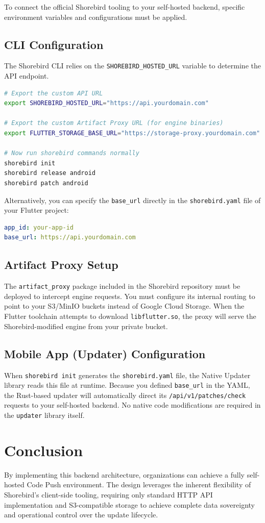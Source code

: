 \documentclass[12pt,a4paper]{article}
\begin{document}
To connect the official Shorebird tooling to your self-hosted backend, specific environment variables and configurations must be applied.

\subsection{CLI Configuration}
The Shorebird CLI relies on the \texttt{SHOREBIRD\_HOSTED\_URL} variable to determine the API endpoint.

\begin{lstlisting}[language=bash]
# Export the custom API URL
export SHOREBIRD_HOSTED_URL="https://api.yourdomain.com"

# Export the custom Artifact Proxy URL (for engine binaries)
export FLUTTER_STORAGE_BASE_URL="https://storage-proxy.yourdomain.com"

# Now run shorebird commands normally
shorebird init
shorebird release android
shorebird patch android
\end{lstlisting}

Alternatively, you can specify the \texttt{base\_url} directly in the \texttt{shorebird.yaml} file of your Flutter project:
\begin{lstlisting}[language=yaml]
app_id: your-app-id
base_url: https://api.yourdomain.com
\end{lstlisting}

\subsection{Artifact Proxy Setup}
The \texttt{artifact\_proxy} package included in the Shorebird repository must be deployed to intercept engine requests. You must configure its internal routing to point to your S3/MinIO buckets instead of Google Cloud Storage.
When the Flutter toolchain attempts to download \texttt{libflutter.so}, the proxy will serve the Shorebird-modified engine from your private bucket.

\subsection{Mobile App (Updater) Configuration}
When \texttt{shorebird init} generates the \texttt{shorebird.yaml} file, the Native Updater library reads this file at runtime. Because you defined \texttt{base\_url} in the YAML, the Rust-based updater will automatically direct its \texttt{/api/v1/patches/check} requests to your self-hosted backend. No native code modifications are required in the \texttt{updater} library itself.

\section{Conclusion}
By implementing this backend architecture, organizations can achieve a fully self-hosted Code Push environment. The design leverages the inherent flexibility of Shorebird's client-side tooling, requiring only standard HTTP API implementation and S3-compatible storage to achieve complete data sovereignty and operational control over the update lifecycle.
\end{document}
